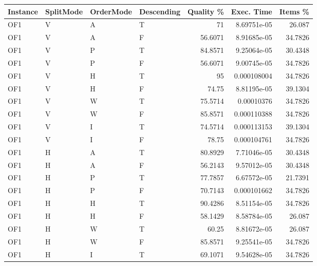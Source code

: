 \begin{longtable}{llllrrr}
    \hline
    Instance & SplitMode & OrderMode & Descending & Quality \% & Exec. Time  & Items \% \\
    \hline
    \endhead
    OF1      & V         & A         & T          & 71         & 8.69751e-05 & 26.087   \\
    OF1      & V         & A         & F          & 56.6071    & 8.91685e-05 & 34.7826  \\
    OF1      & V         & P         & T          & 84.8571    & 9.25064e-05 & 30.4348  \\
    OF1      & V         & P         & F          & 56.6071    & 9.00745e-05 & 34.7826  \\
    OF1      & V         & H         & T          & 95         & 0.000108004 & 34.7826  \\
    OF1      & V         & H         & F          & 74.75      & 8.81195e-05 & 39.1304  \\
    OF1      & V         & W         & T          & 75.5714    & 0.00010376  & 34.7826  \\
    OF1      & V         & W         & F          & 85.8571    & 0.000110388 & 34.7826  \\
    OF1      & V         & I         & T          & 74.5714    & 0.000113153 & 39.1304  \\
    OF1      & V         & I         & F          & 78.75      & 0.000104761 & 34.7826  \\
    OF1      & H         & A         & T          & 80.8929    & 7.71046e-05 & 30.4348  \\
    OF1      & H         & A         & F          & 56.2143    & 9.57012e-05 & 30.4348  \\
    OF1      & H         & P         & T          & 77.7857    & 6.67572e-05 & 21.7391  \\
    OF1      & H         & P         & F          & 70.7143    & 0.000101662 & 34.7826  \\
    OF1      & H         & H         & T          & 90.4286    & 8.51154e-05 & 34.7826  \\
    OF1      & H         & H         & F          & 58.1429    & 8.58784e-05 & 26.087   \\
    OF1      & H         & W         & T          & 60.25      & 8.81672e-05 & 26.087   \\
    OF1      & H         & W         & F          & 85.8571    & 9.25541e-05 & 34.7826  \\
    OF1      & H         & I         & T          & 69.1071    & 9.54628e-05 & 34.7826  \\

\end{longtable}
